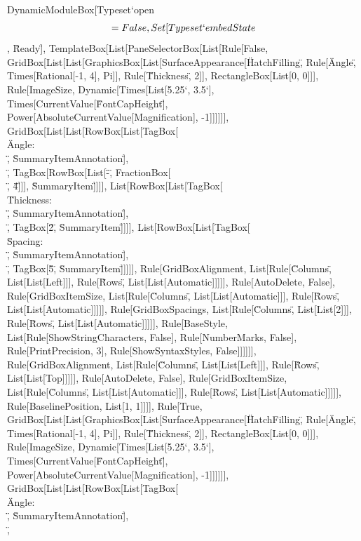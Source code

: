 \documentclass{article}
\begin{document}
{{{{DynamicModuleBox[{Typeset`open$$ = False, Set[Typeset`embedState$$, \"Ready\"]}, TemplateBox[List[PaneSelectorBox[List[Rule[False, GridBox[List[List[GraphicsBox[List[SurfaceAppearance[\"HatchFilling\",
Rule[\"Angle\", Times[Rational[-1, 4], Pi]], Rule[\"Thickness\", 2]], RectangleBox[List[0, 0]]], Rule[ImageSize, Dynamic[Times[List[5.25`, 3.5`],
Times[CurrentValue[\"FontCapHeight\"], Power[AbsoluteCurrentValue[Magnification], -1]]]]]], GridBox[List[List[RowBox[List[TagBox[\"\\\"Angle: \\\"\",
\"SummaryItemAnnotation\"], \"\\[InvisibleSpace]\", TagBox[RowBox[List[\"-\", FractionBox[\"\\[Pi]\", \"4\"]]], \"SummaryItem\"]]]], List[RowBox[List[TagBox[\"\\\"Thickness:
\\\"\", \"SummaryItemAnnotation\"], \"\\[InvisibleSpace]\", TagBox[\"2\", \"SummaryItem\"]]]], List[RowBox[List[TagBox[\"\\\"Spacing: \\\"\", \"SummaryItemAnnotation\"],
\"\\[InvisibleSpace]\", TagBox[\"5\", \"SummaryItem\"]]]]], Rule[GridBoxAlignment, List[Rule[\"Columns\", List[List[Left]]], Rule[\"Rows\", List[List[Automatic]]]]],
Rule[AutoDelete, False], Rule[GridBoxItemSize, List[Rule[\"Columns\", List[List[Automatic]]], Rule[\"Rows\", List[List[Automatic]]]]], Rule[GridBoxSpacings,
List[Rule[\"Columns\", List[List[2]]], Rule[\"Rows\", List[List[Automatic]]]]], Rule[BaseStyle, List[Rule[ShowStringCharacters, False], Rule[NumberMarks,
False], Rule[PrintPrecision, 3], Rule[ShowSyntaxStyles, False]]]]]], Rule[GridBoxAlignment, List[Rule[\"Columns\", List[List[Left]]], Rule[\"Rows\",
List[List[Top]]]]], Rule[AutoDelete, False], Rule[GridBoxItemSize, List[Rule[\"Columns\", List[List[Automatic]]], Rule[\"Rows\", List[List[Automatic]]]]],
Rule[BaselinePosition, List[1, 1]]]], Rule[True, GridBox[List[List[GraphicsBox[List[SurfaceAppearance[\"HatchFilling\", Rule[\"Angle\", Times[Rational[-1,
4], Pi]], Rule[\"Thickness\", 2]], RectangleBox[List[0, 0]]], Rule[ImageSize, Dynamic[Times[List[5.25`, 3.5`], Times[CurrentValue[\"FontCapHeight\"],
Power[AbsoluteCurrentValue[Magnification], -1]]]]]], GridBox[List[List[RowBox[List[TagBox[\"\\\"Angle: \\\"\", \"SummaryItemAnnotation\"], \"\\[InvisibleSpace]\",
}}}}
\end{document}
